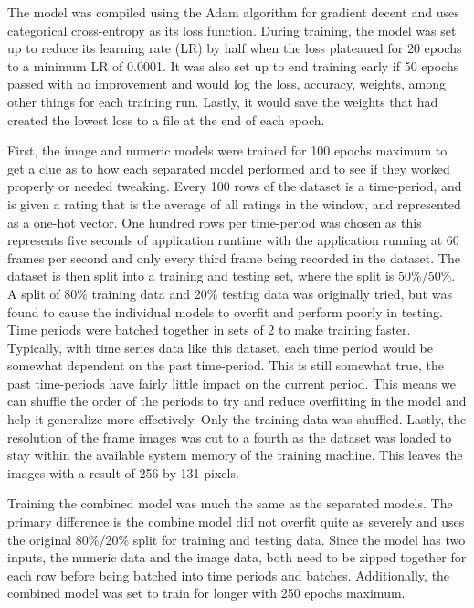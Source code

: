 The model was compiled using the Adam algorithm for gradient decent and uses categorical cross-entropy as its loss function.
During training, the model was set up to reduce its learning rate (LR) by half when the loss plateaued for 20 epochs to a minimum LR of 0.0001.
It was also set up to end training early if 50 epochs passed with no improvement and would log the loss, accuracy, weights, among other things for each training run.
Lastly, it would save the weights that had created the lowest loss to a file at the end of each epoch.

First, the image and numeric models were trained for 100 epochs maximum to get a clue as to how each separated model performed and to see if they worked properly or needed tweaking.
Every 100 rows of the dataset is a time-period, and is given a rating that is the average of all ratings in the window, and represented as a one-hot vector.
One hundred rows per time-period was chosen as this represents five seconds of application runtime with the application running at 60 frames per second and only every third frame being recorded in the dataset.
The dataset is then split into a training and testing set, where the split is 50\%/50\%.
A split of 80\% training data and 20\% testing data was originally tried, but was found to cause the individual models to overfit and perform poorly in testing.
Time periods were batched together in sets of 2 to make training faster.
Typically, with time series data like this dataset, each time period would be somewhat dependent on the past time-period.
This is still somewhat true, the past time-periods have fairly little impact on the current period.
This means we can shuffle the order of the periods to try and reduce overfitting in the model and help it generalize more effectively.
Only the training data was shuffled.
Lastly, the resolution of the frame images was cut to a fourth as the dataset was loaded to stay within the available system memory of the training machine.
This leaves the images with a result of 256 by 131 pixels.

Training the combined model was much the same as the separated models.
The primary difference is the combine model did not overfit quite as severely and uses the original 80\%/20\% split for training and testing data.
Since the model has two inputs, the numeric data and the image data, both need to be zipped together for each row before being batched into time periods and batches.
Additionally, the combined model was set to train for longer with 250 epochs maximum.


